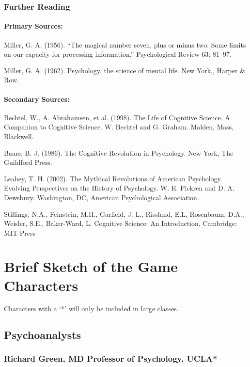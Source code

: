 \subsubsection{Further Reading}
\label{furtherreading}

\paragraph{Primary Sources:}
\label{primarysources:}

Miller, G. A. (1956). ``The magical number seven, plus or minus two: Some limits on our capacity for processing information.'' Psychological Review 63: 81--97.

Miller, G. A. (1962). Psychology, the science of mental life. New York,, Harper \& Row.

\paragraph{Secondary Sources:}
\label{secondarysources:}

Bechtel, W., A. Abrahamsen, et al. (1998). The Life of Cognitive Science. A Companion to Cognitive Science. W. Bechtel and G. Graham. Malden, Mass, Blackwell.

Baars, B. J. (1986). The Cognitive Revolution in Psychology. New York, The Guildford Press.

Leahey, T. H. (2002). The Mythical Revolutions of American Psychology. Evolving Perspectives on the History of Psychology. W. E. Pickren and D. A. Dewsbury. Washington, DC, American Psychological Association.

Stillings, N.A., Feinstein, M.H., Garfield, J. L., Rissland, E.L, Rosenbaum, D.A., Weisler, S.E., Baker-Ward, L. Cognitive Science: An Introduction, Cambridge: MIT Press

\section{Brief Sketch of the Game Characters}
\label{briefsketchofthegamecharacters}

Characters with a `*' will only be included in large classes.

\subsection{Psychoanalysts}
\label{psychoanalysts}

\subsubsection{Richard Green, MD Professor of Psychology, UCLA*}
\label{richardgreenmdprofessorofpsychologyucla}

